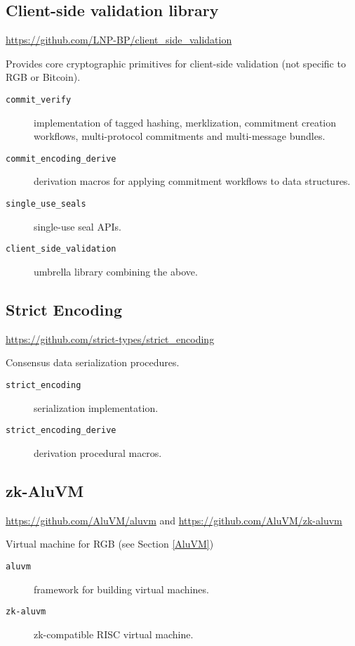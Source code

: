 \documentclass[9pt,oneside]{amsart}
\begin{document}
\subsection{Client-side validation library}

\url{https://github.com/LNP-BP/client_side_validation}

Provides core cryptographic primitives for client-side validation (not specific to RGB or Bitcoin).

\begin{description}
   \item[\texttt{commit\_verify}] implementation of tagged hashing, merklization,
   commitment creation workflows, multi-protocol commitments and multi-message bundles.
   \item[\texttt{commit\_encoding\_derive}]
   derivation macros for applying commitment workflows to data structures.
   \item[\texttt{single\_use\_seals}]
   single-use seal APIs.
   \item[\texttt{client\_side\_validation}]
   umbrella library combining the above.
\end{description}

\subsection{Strict Encoding}

\url{https://github.com/strict-types/strict_encoding}

Consensus data serialization procedures.

\begin{description}
    \item[\texttt{strict\_encoding}] serialization implementation.
    \item[\texttt{strict\_encoding\_derive}] derivation procedural macros.
\end{description}

\subsection{zk-AluVM}

\url{https://github.com/AluVM/aluvm} and \url{https://github.com/AluVM/zk-aluvm}

Virtual machine for RGB (see Section \ref{AluVM})

\begin{description}
    \item[\texttt{aluvm}] framework for building virtual machines.
    \item[\texttt{zk-aluvm}] zk-compatible RISC virtual machine.
\end{description}
\end{document}
